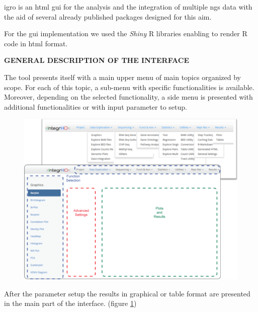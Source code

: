 \gls{igro} is an \gls{html} \gls{gui} for the analysis and the integration of multiple \gls{ngs} data with the aid of several already published packages designed for this aim. 

For the \gls{gui} implementation we used the \textit{Shiny} R libraries enabling to render R code in \gls{html} format.

\textbf{ GENERAL DESCRIPTION OF THE INTERFACE }

The tool presents itself with a main upper menu of main topics organized by scope. For each of this topic, a sub-menu with specific functionalities is available.
Moreover, depending on the selected functionality, a side menu is presented with additional functionalities or with input parameter to setup.


\begin{figure}[H]
\includegraphics[width=\textwidth,height=\textheight,keepaspectratio]{img/integrho/general_description.png}
\caption[integrho main interface]{}
\label{fig:integrhomain}
\centering
\end{figure}
 

After the parameter setup the results in graphical or table format are presented in the main part of the interface. (figure \ref{fig:integrhomain})


